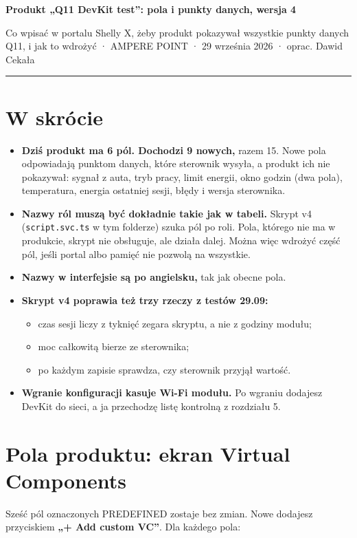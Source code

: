 \documentclass[11pt,a4paper]{article}
\begin{document}
{\LARGE\bfseries Produkt „Q11 DevKit test”: pola i punkty danych, wersja 4\par}
{\large Co wpisać w portalu Shelly X, żeby produkt pokazywał wszystkie punkty danych Q11, i jak to wdrożyć · AMPERE POINT · 29 września 2026 · oprac. Dawid Cekała\par}
\vspace{4pt}\textcolor{apteal}{\rule{\textwidth}{1.2pt}}

\section*{W skrócie}

\begin{itemize}
\item \textbf{Dziś produkt ma 6 pól. Dochodzi 9 nowych,} razem 15. Nowe pola odpowiadają punktom danych, które sterownik wysyła, a produkt ich nie pokazywał: sygnał z auta, tryb pracy, limit energii, okno godzin (dwa pola), temperatura, energia ostatniej sesji, błędy i wersja sterownika.
\item \textbf{Nazwy ról muszą być dokładnie takie jak w tabeli.} Skrypt v4 (\texttt{script.\allowbreak{}svc.\allowbreak{}ts} w tym folderze) szuka pól po roli. Pola, którego nie ma w produkcie, skrypt nie obsługuje, ale działa dalej. Można więc wdrożyć część pól, jeśli portal albo pamięć nie pozwolą na wszystkie.
\item \textbf{Nazwy w interfejsie są po angielsku,} tak jak obecne pola.
\item \textbf{Skrypt v4 poprawia też trzy rzeczy z testów 29.09:}
\begin{itemize}
\item czas sesji liczy z tyknięć zegara skryptu, a nie z godziny modułu;
\item moc całkowitą bierze ze sterownika;
\item po każdym zapisie sprawdza, czy sterownik przyjął wartość.
\end{itemize}
\item \textbf{Wgranie konfiguracji kasuje Wi-Fi modułu.} Po wgraniu dodajesz DevKit do sieci, a ja przechodzę listę kontrolną z rozdziału 5.
\end{itemize}

\section{Pola produktu: ekran Virtual Components}

Sześć pól oznaczonych PREDEFINED zostaje bez zmian. Nowe dodajesz przyciskiem \textbf{„+ Add custom VC”}. Dla każdego pola:
\end{document}

